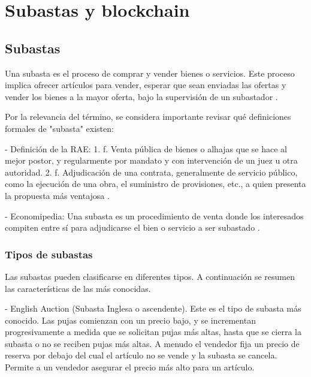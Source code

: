 \chapter{Subastas y blockchain}\label{chapter:chapter1}

\hspace*{}

\section{Subastas}
  
  \hspace*{}

  Una subasta es el proceso de comprar y vender bienes o servicios. Este proceso implica ofrecer artículos 
  para vender, esperar que sean enviadas las ofertas y vender los bienes a la mayor oferta, bajo la supervisión
  de un subastador \parencite{krishna}.


  Por la relevancia del término, se considera importante revisar qué definiciones formales de "subasta" existen:

  - Definición de la RAE: %
  1. f. Venta pública de bienes o alhajas que se hace al mejor postor, y regularmente por mandato y con intervención de un juez u otra 
  autoridad.
  2. f. Adjudicación de una contrata, generalmente de servicio público, como la ejecución de una obra, el suministro de provisiones, etc., 
  a quien presenta la propuesta más ventajosa \parencite{raesubasta}.

  - Economipedia:
  Una subasta es un procedimiento de venta donde los interesados compiten entre sí para adjudicarse el bien o servicio a ser subastado 
  \parencite{economipediasubasta}.

  \subsection{Tipos de subastas} \hspace*{}

    Las subastas pueden clasificarse en diferentes tipos. A continuación se resumen las características de las más conocidas.

    - English Auction (Subasta Inglesa o ascendente). Este es el tipo de subasta más conocido. Las pujas comienzan con un precio bajo, y se 
    incrementan progresivamente a medida que se solicitan pujas más altas, hasta que se cierra la subasta o 
    no se reciben pujas más altas. A menudo el vendedor fija un precio de reserva por debajo del cual el 
    artículo no se vende y la subasta se cancela. Permite a un vendedor asegurar el precio más alto para un 
    artículo.


